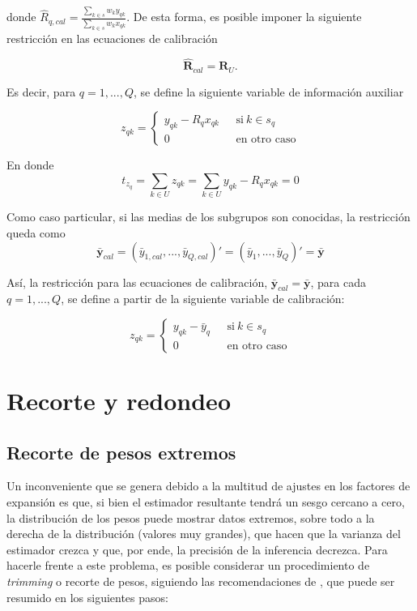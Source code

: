 \documentclass[
  12pt,
  spanish,
]{book}
\begin{document}
donde \(\hat{R}_{q,cal} = \frac{\sum_{k \in s}w_ky_{qk}}{\sum_{k \in s}w_kx_{qk}}\). De esta forma, es posible imponer la siguiente restricción en las ecuaciones de calibración

\[
\hat{\textbf{R}}_{cal} = \textbf{R}_U.
\]

Es decir, para \(q = 1,..., Q\), se define la siguiente variable de información auxiliar

\begin{equation*}
z_{qk} = 
\begin{cases} 
y_{qk} - R_qx_{qk} \ \ \ &\text{si} \ k \in s_q \\ 
0 &\text{en otro caso}
\end{cases}
\end{equation*}

En donde
\[
t_{z_q} = \sum_{k \in U}z_{qk} = \sum_{k \in U}y_{qk} - R_qx_{qk} = 0
\]

Como caso particular, si las medias de los subgrupos son conocidas, la restricción queda como
\[
\bar{\textbf{y}}_{cal} = (\bar{y}_{1,cal},...,\bar{y}_{Q,cal})' = (\bar{y}_{1},...,\bar{y}_{Q})' = \bar{\textbf{y}}
\]

Así, la restricción para las ecuaciones de calibración, \(\bar{\textbf{y}}_{cal} = \bar{\textbf{y}}\), para cada \(q = 1,...,Q\), se define a partir de la siguiente variable de calibración:

\begin{equation*}
z_{qk} = 
\begin{cases} 
y_{qk} - \bar{y}_{q} \ \ \ &\text{si} \ k \in s_q \\ 
0 &\text{en otro caso}
\end{cases}
\end{equation*}

\hypertarget{recorte-y-redondeo}{%
\section{Recorte y redondeo}\label{recorte-y-redondeo}}

\hypertarget{recorte-de-pesos-extremos}{%
\subsection*{Recorte de pesos extremos}\label{recorte-de-pesos-extremos}}

Un inconveniente que se genera debido a la multitud de ajustes en los factores de expansión es que, si bien el estimador resultante tendrá un sesgo cercano a cero, la distribución de los pesos puede mostrar datos extremos, sobre todo a la derecha de la distribución (valores muy grandes), que hacen que la varianza del estimador crezca y que, por ende, la precisión de la inferencia decrezca. Para hacerle frente a este problema, es posible considerar un procedimiento de \emph{trimming} o recorte de pesos, siguiendo las recomendaciones de \citet[sec.~14.4]{Valliant_Dever_Kreuter_2018}, que puede ser resumido en los siguientes pasos:
\end{document}
